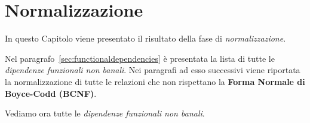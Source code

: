 \chapter{Normalizzazione}
In questo Capitolo viene presentato il risultato della fase di {\it normalizzazione}.

Nel paragrafo~\vref{sec:functionaldependencies} è presentata la lista di tutte le {\it dipendenze
funzionali non banali}. Nei paragrafi ad esso successivi viene riportata la normalizzazione
di tutte le relazioni che non rispettano la {\bf Forma Normale di Boyce-Codd (BCNF)}.

Vediamo ora tutte le {\it dipendenze funzionali non banali}.



